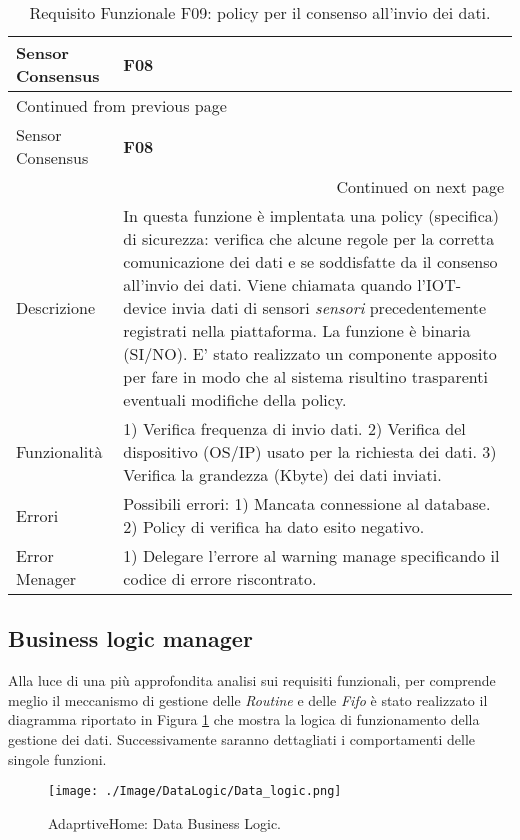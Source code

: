 \documentclass[onecolumn,a4paper]{article}
\begin{document}
\begin{longtable}{|p{3cm}|p{10cm}|}
\caption{Requisito Funzionale F09: policy per il consenso all'invio dei dati.}
\\
\cellcolor{grey!15}Sensor Consensus & \cellcolor{grey!15} \textbf{F08}\\
\hline
\endfirsthead
\multicolumn{2}{l}{Continued from previous page} \\
\hline

\cellcolor{grey!15}Sensor Consensus & \cellcolor{grey!15} \textbf{F08} \\

\hline
\endhead
\hline\multicolumn{2}{r}{Continued on next page} \\
\endfoot
\endlastfoot
\hline
Descrizione & In questa funzione è implentata una policy (specifica) di sicurezza: verifica che alcune regole per la corretta comunicazione dei dati e se soddisfatte da il consenso all'invio dei dati. Viene chiamata quando l'IOT-device invia dati di sensori \emph{sensori} precedentemente registrati nella piattaforma. La funzione è binaria (SI/NO). E' stato realizzato un componente apposito per fare in modo che al sistema risultino trasparenti eventuali modifiche della policy.\\
\hline
Funzionalità & 1) Verifica frequenza di invio dati. 2) Verifica del dispositivo (OS/IP) usato per la richiesta dei dati. 3) Verifica la grandezza (Kbyte) dei dati inviati.\\
\hline
Errori & Possibili errori: 1) Mancata connessione al database. 2) Policy di verifica ha dato esito negativo.\\
\hline
Error Menager & 1) Delegare l'errore al warning manage specificando il codice di errore riscontrato.\\
\hline
\end{longtable}
\subsection{Business logic manager}
\label{sec:org8d9cc1b}
Alla luce di una più approfondita analisi sui requisiti funzionali, per comprende meglio il meccanismo di gestione delle \emph{Routine} e delle \emph{Fifo} è stato realizzato il diagramma riportato in Figura \ref{fig:org43b4fde} che mostra la logica di funzionamento della gestione dei dati. Successivamente saranno dettagliati i comportamenti delle singole funzioni. 

\begin{figure}[htbp]
\centering
\texttt{[image: ./Image/DataLogic/Data\_logic.png]}
\caption{\label{fig:org43b4fde}AdaprtiveHome: Data Business Logic.}
\end{figure}
\end{document}
